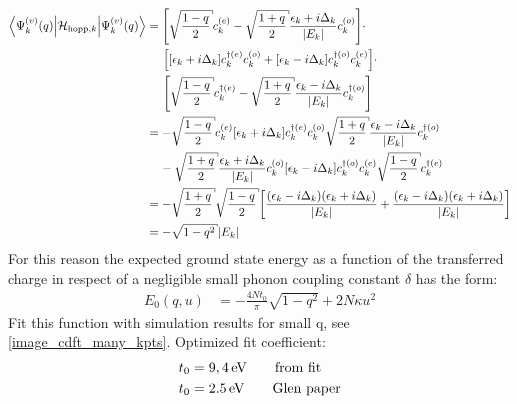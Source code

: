 \begin{align}
	\left\langle\Psi_k^{(v)}(q)\Big|\mathcal{H}_{\text{hopp},k}\Big|\Psi_k^{(v)}(q)\right\rangle &= \left[\sqrt{\frac{1-q}{2}}c_k^{(e)}- \sqrt{\frac{1+q}{2}}\frac{\epsilon_k + i \Delta_k}{|E_k|}c_{k}^{(o)}\right]\cdot\nonumber\\
	&\hspace*{0.5cm}\left[
	\left[\epsilon_k + i\Delta_k\right]c_{k}^{\dagger(e)}c_{k}^{(o)} + \left[\epsilon_k-i\Delta_k \right]	c_{k}^{\dagger(o)}c_{k}^{(e)}
	\right]\cdot\nonumber\\
	&\hspace*{0.5cm}\left[\sqrt{\frac{1-q}{2}}c_k^{\dagger(e)}- \sqrt{\frac{1+q}{2}}\frac{\epsilon_k - i \Delta_k}{|E_k|}c_{k}^{\dagger(o)}\right]\\
	&=-\sqrt{\frac{1-q}{2}}c_k^{(e)}\left[\epsilon_k+i\Delta_k \right]	c_{k}^{\dagger(e)}c_{k}^{(o)}\sqrt{\frac{1+q}{2}}\frac{\epsilon_k - i \Delta_k}{|E_k|}c_{k}^{\dagger(o)}\nonumber\\
	&\hspace*{0.4cm}-\sqrt{\frac{1+q}{2}}\frac{\epsilon_k + i \Delta_k}{|E_k|}c_{k}^{(o)}\left[\epsilon_k - i\Delta_k\right]c_{k}^{\dagger(o)}c_{k}^{(e)}\sqrt{\frac{1-q}{2}}c_k^{\dagger(e)}\\
	&=-\sqrt{\frac{1+q}{2}}\sqrt{\frac{1-q}{2}}\left[\frac{(\epsilon_k-i\Delta_k)(\epsilon_k+i\Delta_k)}{|E_k|}+\frac{(\epsilon_k-i\Delta_k)(\epsilon_k+i\Delta_k)}{|E_k|}\right]\\
	&= -\sqrt{1-q^2} |E_k|
\end{align}
For this reason the expected ground state energy  as a function of the transferred charge in respect of a negligible small  phonon coupling constant $\delta$ has the form:
\begin{align}
	E_0(q, u) &= -\frac{4Nt_0}{\pi} \sqrt{1-q^2} + 2N\kappa u^2
\end{align}  
Fit this function with simulation results for small q, see \cref{image_cdft_many_kpts}. Optimized fit coefficient:
\begin{align}
	t_0 &= \unit[9,4]{eV}\qquad\text{from fit}\\
	t_0 &= \unit[2.5]{eV}\qquad\text{Glen paper}
\end{align}
